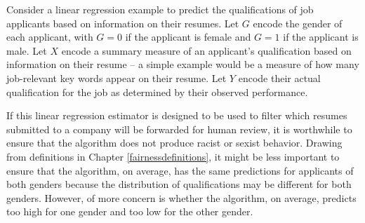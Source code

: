 \documentclass[12pt, twoside]{amherstthesis}
\begin{document}
Consider a linear regression example to predict the qualifications of job applicants based on information on their resumes. Let \(G\) encode the gender of each applicant, with \(G=0\) if the applicant is female and \(G=1\) if the applicant is male. Let \(X\) encode a summary measure of an applicant's qualification based on information on their resume -- a simple example would be a measure of how many job-relevant key words appear on their resume. Let \(Y\) encode their actual qualification for the job as determined by their observed performance.

If this linear regression estimator is designed to be used to filter which resumes submitted to a company will be forwarded for human review, it is worthwhile to ensure that the algorithm does not produce racist or sexist behavior. Drawing from definitions in Chapter \ref{fairnessdefinitions}, it might be less important to ensure that the algorithm, on average, has the same predictions for applicants of both genders because the distribution of qualifications may be different for both genders. However, of more concern is whether the algorithm, on average, predicts too high for one gender and too low for the other gender.
\end{document}
